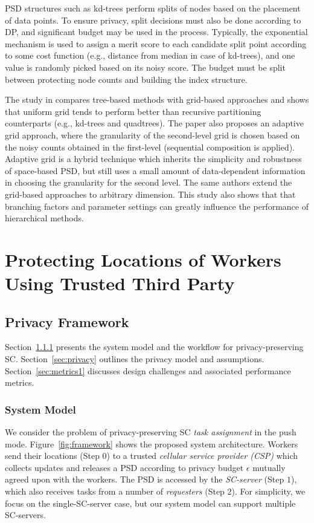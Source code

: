 \documentclass{USC-Thesis}
\numberwithin{equation}{chapter}
\begin{document}
PSD structures such as kd-trees \cite{cormode2012differentially} perform splits of nodes based on the placement of data points. To ensure privacy, split decisions must also be done according to DP, and significant budget may be used in the process. Typically, the exponential mechanism \cite{cormode2012differentially} is used to assign a merit score to each candidate split point according to some cost function (e.g., distance from median in case of kd-trees), and one value is randomly picked based on its noisy score. The budget must be split between protecting node counts and building the index structure.

The study in \cite{qardaji2012differentially} compares tree-based methods with grid-based approaches and shows that uniform grid tends to perform better than recursive partitioning counterparts (e.g., kd-trees and quadtrees). The paper also proposes an adaptive grid approach, where the granularity of the second-level grid is chosen based on the noisy counts obtained in the first-level (sequential composition is applied). Adaptive grid is a hybrid technique which inherits the simplicity and robustness of space-based PSD, but still uses a small amount of data-dependent information in choosing the granularity for the second level. The same authors \cite{qardaji2013understanding} extend the grid-based approaches to arbitrary dimension. This study also shows that that branching factors and parameter settings can greatly influence the performance of hierarchical methods.

\section{Protecting Locations of Workers Using Trusted Third Party}

\subsection{Privacy Framework}
\label{sec:fwork}
Section~\ref{sec:system1} presents the system model and the workflow for privacy-preserving SC.
Section~\ref{sec:privacy} outlines the privacy model and assumptions.  
Section~\ref{sec:metrics1} discusses design challenges and associated performance metrics.

\subsubsection{System Model}
\label{sec:system1}
We consider the problem of privacy-preserving SC {\em task assignment} in the push mode. Figure~\ref{fig:framework} shows the proposed system architecture. Workers send their locations (Step $0$) to a trusted {\em cellular service provider (CSP)} which collects updates and releases a PSD according to privacy budget $\epsilon$ mutually agreed upon with the workers. The PSD is accessed by the {\em SC-server} (Step $1$), which also receives tasks from a number of {\em requesters} (Step $2$). For simplicity, we focus on the single-SC-server case, but our system model can support multiple SC-servers.
\end{document}
